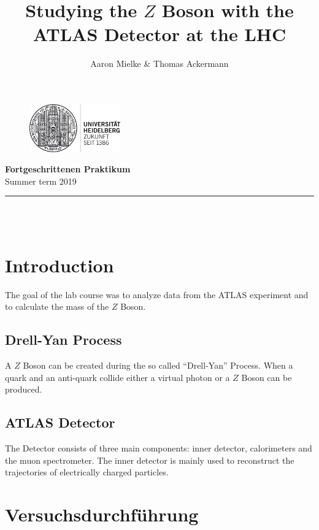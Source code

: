 \documentclass[12pt, a4paper, bibliography=totoc]{scrartcl}
\title{Studying the $Z$ Boson with the ATLAS Detector at the LHC}
\author{Aaron Mielke & Thomas Ackermann}
\begin{document}
\begin{center}
	\makeatletter
	\thispagestyle{empty}
	
	\begin{figure}[H]
	\flushright
	\includegraphics[width=0.35\textwidth]{fig/logo}
	\end{figure}
	
	\vspace{-30mm}
	
	\begin{flushleft}
	\large{\textbf{Fortgeschrittenen Praktikum} \\
		Summer term 2019} \\
	\end{flushleft}
	
	\vspace{5mm}
	
	\rule{\textwidth}{0.2pt}

	\vspace{50mm}
	\Huge\textbf{\@title} \\
	\vspace{10mm}
	\large{\@author} \\
	\normalfont
	
	\vspace{2mm}
	
	\makeatother
\end{center}

\normalsize
\newpage

\tableofcontents

\section{Introduction}

The goal of the lab course was to analyze data from the ATLAS experiment and 
to calculate the mass of the $Z$ Boson.

\subsection{Drell-Yan Process}
A $Z$ Boson can be created during the so called ``Drell-Yan'' Process.
When a quark and an anti-quark collide either a virtual photon or a $Z$ Boson can be produced.

\subsection{ATLAS Detector}
The Detector consists of three main components: inner detector, calorimeters and the muon spectrometer.
The inner detector is mainly used to reconstruct the trajectories of electrically charged particles.



\section{Versuchsdurchführung}
\end{document}
